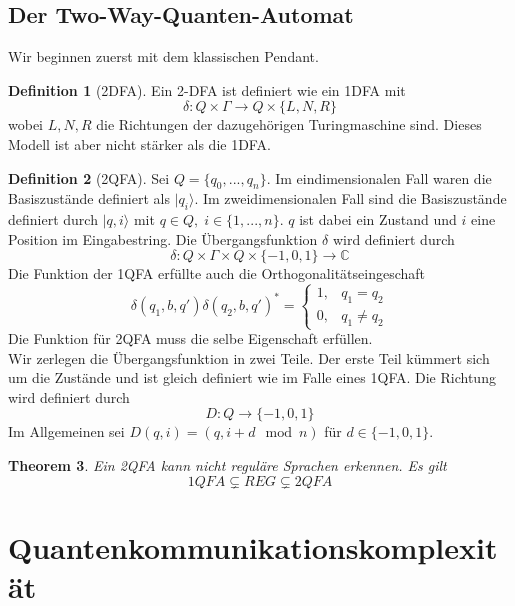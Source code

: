 \documentclass[a4paper, 12pt]{article}
\theoremstyle{plain}
\newtheorem{theorem}{Theorem}[section] %
\theoremstyle{definition}
\newtheorem{definition}[theorem]{Definition} %
\theoremstyle{lemma}
\theoremstyle{remark}
\theoremstyle{example}
\begin{document}
	\subsection{Der Two-Way-Quanten-Automat}
	Wir beginnen zuerst mit dem klassischen Pendant.
	\begin{definition}[2DFA]
		Ein 2-DFA ist definiert wie ein 1DFA mit \[\delta: Q\times \Gamma \to Q\times \{L,N,R\}\] wobei $L,N,R$ die Richtungen der dazugehörigen Turingmaschine sind. Dieses Modell ist aber nicht stärker als die 1DFA. 
	\end{definition}
	\begin{definition}[2QFA]
		Sei $Q = \{q_0,...,q_n\}$. Im eindimensionalen Fall waren die Basiszustände definiert als $|q_i\rangle$. Im zweidimensionalen Fall sind die Basiszustände definiert durch $|q,i\rangle$ mit $q\in Q, \; i \in \{1,...,n\}$. $q$ ist dabei ein Zustand und $i$ eine Position im Eingabestring. Die Übergangsfunktion $\delta$ wird definiert durch \[\delta: Q \times \Gamma \times Q\times \{-1,0,1\} \to \mathbb{C}\]
		Die Funktion der 1QFA erfüllte auch die Orthogonalitätseingeschaft \[\delta(q_1,b,q')\delta(q_2,b,q')^* = \begin{cases}
			1, & q_1 = q_2\\
			0, & q_1\neq q_2
		\end{cases}\]
		Die Funktion für 2QFA muss die selbe Eigenschaft erfüllen.\\
		Wir zerlegen die Übergangsfunktion in zwei Teile. Der erste Teil kümmert sich um die Zustände und ist gleich definiert wie im Falle eines 1QFA. Die Richtung wird definiert durch \[D:Q\to \{-1,0,1\}\]
		Im Allgemeinen sei $D(q,i) = (q,i+d \mod n)$ für $d \in \{-1,0,1\}$. 
	\end{definition}
	\begin{theorem}
		Ein 2QFA kann nicht reguläre Sprachen erkennen. Es gilt \[1QFA \subsetneq REG \subsetneq 2QFA\]
	\end{theorem}
	\section{Quantenkommunikationskomplexität}
\end{document}
